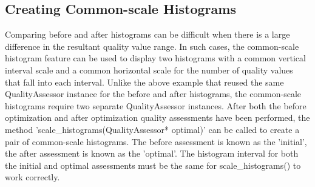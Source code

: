 \subsection{Creating Common-scale Histograms}

Comparing before and after histograms can be difficult when there is a large difference in the resultant quality value range.  In such cases, the common-scale histogram feature can be used to display two histograms with a common vertical interval scale and a common horizontal scale for the number of quality values that fall into each interval.  Unlike the above example that reused the same QualityAssessor instance for the before and after histograms, the common-scale histograms require two separate QualityAssessor instances.  After both the before optimization and after optimization quality assessments have been performed, the method 'scale\_histograms(QualityAssessor* optimal)' can be called to create a pair of common-scale histograms.  The before assessment is known as the 'initial', the after assessment is known as the 'optimal'.   The histogram interval for both the initial and optimal assessments must be the same for scale\_histograms() to work correctly.


